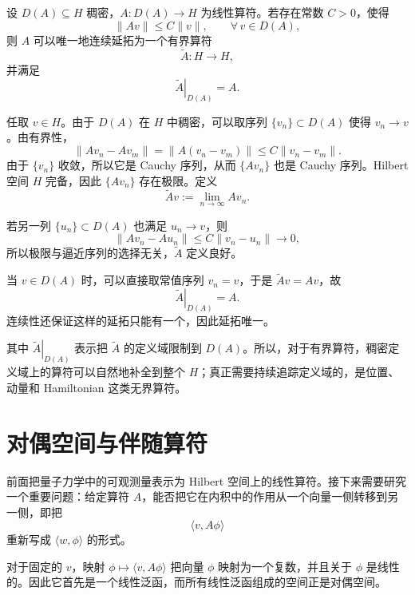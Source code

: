 \documentclass[UTF8,a4paper,11pt,openany]{ctexbook}
\begin{document}
\begin{proposition}[有界算符的连续延拓]
设 $D(A)\subseteq H$ 稠密，$A:D(A)\to H$ 为线性算符。若存在常数 $C>0$，使得
\begin{equation}
    \|Av\|\leq C\|v\|,
    \qquad
    \forall\,v\in D(A),
\end{equation}
则 $A$ 可以唯一地连续延拓为一个有界算符
\[
\widetilde A:H\to H,
\]
并满足
\[
\left.\widetilde A\right|_{D(A)}=A.
\]
\end{proposition}

\begin{proofblock}
任取 $v\in H$。由于 $D(A)$ 在 $H$ 中稠密，可以取序列 $\{v_n\}\subset D(A)$ 使得 $v_n\to v$。由有界性，
\[
\|Av_n-Av_m\|
=
\|A(v_n-v_m)\|
\leq
C\|v_n-v_m\|.
\]
由于 $\{v_n\}$ 收敛，所以它是 Cauchy 序列，从而 $\{Av_n\}$ 也是 Cauchy 序列。Hilbert 空间 $H$ 完备，因此 $\{Av_n\}$ 存在极限。定义
\begin{equation}
    \widetilde A v
    :=
    \lim_{n\to\infty}Av_n.
\end{equation}

若另一列 $\{u_n\}\subset D(A)$ 也满足 $u_n\to v$，则
\[
\|Av_n-Au_n\|
\leq
C\|v_n-u_n\|
\longrightarrow0,
\]
所以极限与逼近序列的选择无关，$\widetilde A$ 定义良好。

当 $v\in D(A)$ 时，可以直接取常值序列 $v_n=v$，于是 $\widetilde Av=Av$，故
\[
\left.\widetilde A\right|_{D(A)}=A.
\]
连续性还保证这样的延拓只能有一个，因此延拓唯一。
\end{proofblock}

其中 $\left.\widetilde A\right|_{D(A)}$ 表示把 $\widetilde A$ 的定义域限制到 $D(A)$。所以，对于有界算符，稠密定义域上的算符可以自然地补全到整个 $H$；真正需要持续追踪定义域的，是位置、动量和 Hamiltonian 这类无界算符。


\section{对偶空间与伴随算符}

前面把量子力学中的可观测量表示为 Hilbert 空间上的线性算符。接下来需要研究一个重要问题：给定算符 $A$，能否把它在内积中的作用从一个向量一侧转移到另一侧，即把
\[
\langle v,A\phi\rangle
\]
重新写成 $\langle w,\phi\rangle$ 的形式。

对于固定的 $v$，映射 $\phi\mapsto\langle v,A\phi\rangle$ 把向量 $\phi$ 映射为一个复数，并且关于 $\phi$ 是线性的。因此它首先是一个线性泛函，而所有线性泛函组成的空间正是对偶空间。
\end{document}
